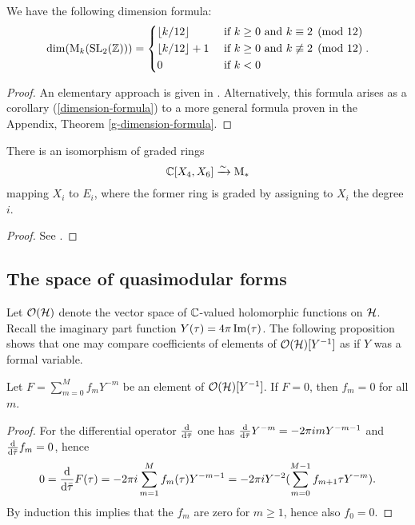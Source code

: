 \begin{prop} \label{baby-dimension-formula}
 We have the following dimension formula:
 \[
  \dim(\mathrm{M}_k(\operatorname{SL}_2(\mathbb{Z})))=\begin{dcases}
                      \left \lfloor {k}/{12} \right\rfloor & \text{ if $k\geq 0$ and $k\equiv 2 \pmod{12}$}\\
                      \left \lfloor {k}/{12} \right\rfloor+1 & \text{ if $k\geq 0$ and $k\not\equiv 2 \pmod{12}$}\\
                      0 & \text{ if $k<0$}
                     \end{dcases}.
 \]
\end{prop}
\begin{proof}
 An elementary approach is given in \cite[Ch.~VII, Corollary 1]{Serre1973}. Alternatively, this formula arises as a corollary (\ref{dimension-formula}) to a more general formula proven in the Appendix, Theorem \ref{g-dimension-formula}.
\end{proof}

\begin{prop}
 There is an isomorphism of graded rings \[\mathbb{C}[X_4, X_6]\xrightarrow{\sim} \mathrm{M}_*\] mapping $X_i$ to $E_i$, where the former ring is graded by assigning to $X_i$ the degree $i$.
\end{prop}
\begin{proof}
 See \cite[Ch.~VII, Corollary 2]{Serre1973}.
\end{proof}

\subsection{The space of quasimodular forms}

Let $\mathcal{O}(\mathcal{H})$ denote the vector space of $\mathbb{C}$-valued holomorphic functions on $\mathcal{H}$. Recall the imaginary part function $Y(\tau)=4\pi\operatorname{Im}(\tau)$. The following proposition shows that one may compare coefficients of elements of $\mathcal{O}(\mathcal{H})[Y^{-1}]$ as if $Y$ was a formal variable.

\begin{prop}
 Let $F=\sum_{m=0}^Mf_mY^{-m}$ be an element of $\mathcal{O}(\mathcal{H})[Y^{-1}]$. If $F=0$, then $f_m=0$ for all $m$.
\end{prop}
\begin{proof}
 For the differential operator $\frac{\mathrm{d}}{\mathrm{d}\bar{\tau}}$ one has $\frac{\mathrm{d}}{\mathrm{d}\bar{\tau}}Y^{-m}=-2\pi imY^{-m-1}$ and $\frac{\mathrm{d}}{\mathrm{d}\bar{\tau}}f_m=0$, hence \[0=\frac{\mathrm{d}}{\mathrm{d}\bar{\tau}}F(\tau)=-2\pi i\sum_{m=1}^{M}f_m(\tau)Y^{-m-1}=-2\pi iY^{-2}(\sum_{m=0}^{M-1}f_{m+1}{\tau}Y^{-m}).\]
 By induction this implies that the $f_m$ are zero for $m\geq 1$, hence also $f_0=0$.
\end{proof}

